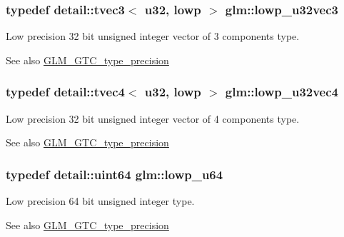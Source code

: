 \subsubsection[{\texorpdfstring{lowp\+\_\+u32vec3}{lowp_u32vec3}}]{\setlength{\rightskip}{0pt plus 5cm}typedef detail\+::tvec3$<$ u32, lowp $>$ {\bf glm\+::lowp\+\_\+u32vec3}}\hypertarget{group__gtc__type__precision_ga53b6133cd2491fce1445c1744556b1bb}{}\label{group__gtc__type__precision_ga53b6133cd2491fce1445c1744556b1bb}
Low precision 32 bit unsigned integer vector of 3 components type. \begin{DoxySeeAlso}{See also}
\hyperlink{group__gtc__type__precision}{G\+L\+M\+\_\+\+G\+T\+C\+\_\+type\+\_\+precision} 
\end{DoxySeeAlso}
\subsubsection[{\texorpdfstring{lowp\+\_\+u32vec4}{lowp_u32vec4}}]{\setlength{\rightskip}{0pt plus 5cm}typedef detail\+::tvec4$<$ u32, lowp $>$ {\bf glm\+::lowp\+\_\+u32vec4}}\hypertarget{group__gtc__type__precision_gaad6408408c9c5321cb6ee54f201de578}{}\label{group__gtc__type__precision_gaad6408408c9c5321cb6ee54f201de578}
Low precision 32 bit unsigned integer vector of 4 components type. \begin{DoxySeeAlso}{See also}
\hyperlink{group__gtc__type__precision}{G\+L\+M\+\_\+\+G\+T\+C\+\_\+type\+\_\+precision} 
\end{DoxySeeAlso}
\subsubsection[{\texorpdfstring{lowp\+\_\+u64}{lowp_u64}}]{\setlength{\rightskip}{0pt plus 5cm}typedef detail\+::uint64 {\bf glm\+::lowp\+\_\+u64}}\hypertarget{group__gtc__type__precision_ga61ed4c68a4cffb77cd63cc107119123a}{}\label{group__gtc__type__precision_ga61ed4c68a4cffb77cd63cc107119123a}
Low precision 64 bit unsigned integer type. \begin{DoxySeeAlso}{See also}
\hyperlink{group__gtc__type__precision}{G\+L\+M\+\_\+\+G\+T\+C\+\_\+type\+\_\+precision} 
\end{DoxySeeAlso}
